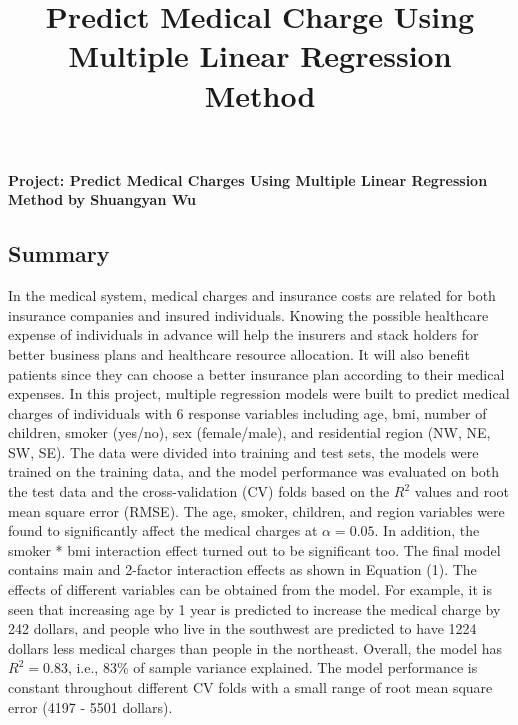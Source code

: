 \documentclass[12pt]{article}
\title{Predict Medical Charge Using Multiple Linear Regression Method}
\begin{document}
\begin{titlepage}
\begin{center}
\vspace*{6cm}
\textbf{Project: Predict Medical Charges Using Multiple Linear Regression Method}
\vspace{5.5cm} 
\textbf{by Shuangyan Wu}
       
\end{center}
\end{titlepage}
\tableofcontents
\listoffigures
\listoftables

\newpage
\begin{center}
\section*{Summary}    
\end{center}
In the medical system, medical charges and insurance costs are related for both insurance companies and insured individuals. Knowing the possible healthcare expense of individuals in advance will help the insurers and stack holders for better business plans and healthcare resource allocation. It will also benefit patients since they can choose a better insurance plan according to their medical expenses. In this project, multiple regression models were built to predict medical charges of individuals with 6 response variables including age, bmi, number of children, smoker (yes/no), sex (female/male), and residential region (NW, NE, SW, SE). The data were divided into training and test sets, the models were trained on the training data, and the model performance was evaluated on both the test data and the cross-validation (CV) folds based on the $R^2$ values and root mean square error (RMSE). The age, smoker, children, and region variables were found to significantly affect the medical charges at $\alpha=0.05$. In addition, the smoker * bmi interaction effect turned out to be significant too. The final model contains main and 2-factor interaction effects as shown in Equation (1). The effects of different variables can be obtained from the model. For example, it is seen that increasing age by 1 year is predicted to increase the medical charge by 242 dollars, and people who live in the southwest are predicted to have 1224 dollars less medical charges than people in the northeast. Overall, the model has $R^2=0.83$, i.e., 83\% of sample variance explained. The model performance is constant throughout different CV folds with a small range of root mean square error (4197 - 5501 dollars).
\end{document}
